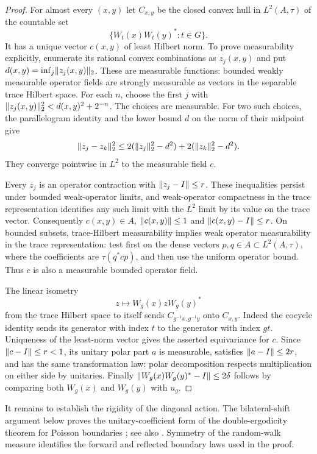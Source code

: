 \begin{proof}
For almost every $(x,y)$ let $C_{x,y}$ be the closed convex hull in
$L^2(A,\tau)$ of the countable set
\[
 \{W_t(x)W_t(y)^*:t\in G\}.
\]
It has a unique vector $c(x,y)$ of least Hilbert norm.  To prove
measurability explicitly, enumerate its rational convex combinations
as $z_j(x,y)$ and put $d(x,y)=\inf_j\lVert z_j(x,y)\rVert_2$.
These are measurable functions: bounded weakly measurable operator
fields are strongly measurable as vectors in the separable trace
Hilbert space.  For each $n$, choose the first $j$ with
$\lVert z_j(x,y)\rVert_2^2<d(x,y)^2+2^{-n}$.  The choices are measurable.
For two such choices, the parallelogram identity and the lower bound
$d$ on the norm of their midpoint give
\[
 \lVert z_j-z_k\rVert_2^2
 \le2(\lVert z_j\rVert_2^2-d^2)+2(\lVert z_k\rVert_2^2-d^2).
\]
They converge pointwise in $L^2$ to the measurable field $c$.

Every $z_j$ is an operator contraction with $\lVert z_j-I\rVert\le r$.
These inequalities persist under bounded weak-operator limits, and
weak-operator compactness in the trace representation identifies any
such limit with the $L^2$ limit by its value on the trace vector.
Consequently $c(x,y)\in A$, $\lVert c(x,y)\rVert\le1$ and
$\lVert c(x,y)-I\rVert\le r$.  On bounded subsets, trace-Hilbert
measurability implies weak operator measurability in the trace
representation: test first on the dense vectors $p,q\in A\subset
L^2(A,\tau)$, where the coefficients are $\tau(q^*cp)$, and then
use the uniform operator bound.  Thus $c$ is also a measurable bounded
operator field.

The linear isometry
\[
 z\longmapsto W_g(x)zW_g(y)^*
\]
from the trace Hilbert space to itself sends
$C_{g^{-1}x,g^{-1}y}$ onto $C_{x,y}$.  Indeed the cocycle identity
sends its generator with index $t$ to the generator with index $gt$.
Uniqueness of the least-norm vector gives the asserted equivariance
for $c$.  Since $\lVert c-I\rVert\le r<1$, its unitary polar part $a$ is
measurable, satisfies $\lVert a-I\rVert\le2r$, and has the same
transformation law: polar decomposition respects multiplication on
either side by unitaries.  Finally
$\lVert W_g(x)W_g(y)^*-I\rVert\le2\delta$ follows by comparing both
$W_g(x)$ and $W_g(y)$ with $u_g$.
\end{proof}

It remains to establish the rigidity of the diagonal action.
The bilateral-shift argument below proves the unitary-coefficient form
of the double-ergodicity theorem for Poisson boundaries
\cite{Kaimanovich2003}; see also
\cite[Theorem~2.1 and Remark~2.2, p.~7]{Bjorklund2014}.
Symmetry of the random-walk measure identifies the forward and
reflected boundary laws used in the proof.

